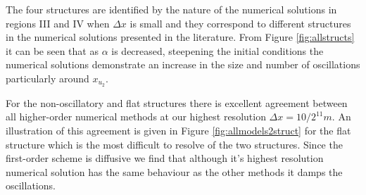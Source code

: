 \documentclass[times]{elsarticle}
\begin{document}
The four structures are identified by the nature of the numerical solutions in regions III and IV when $\Delta x$ is small and they correspond to different structures in the numerical solutions presented in the literature. From Figure \ref{fig:allstructs} it can be seen that as $\alpha$ is decreased, steepening the initial conditions the numerical solutions demonstrate an increase in the size and number of oscillations particularly around $x_{u_2}$. 

For the non-oscillatory and flat structures there is excellent agreement between all higher-order numerical methods at our highest resolution $\Delta x = 10/2^{11}m$. An illustration of this agreement is given in Figure \ref{fig:allmodels2struct} for the flat structure which is the most difficult to resolve of the two structures. Since the first-order scheme is diffusive \cite{Zoppou-etal-2017} we find that although it's highest resolution numerical solution has the same behaviour as the other methods it damps the oscillations.
\end{document}
